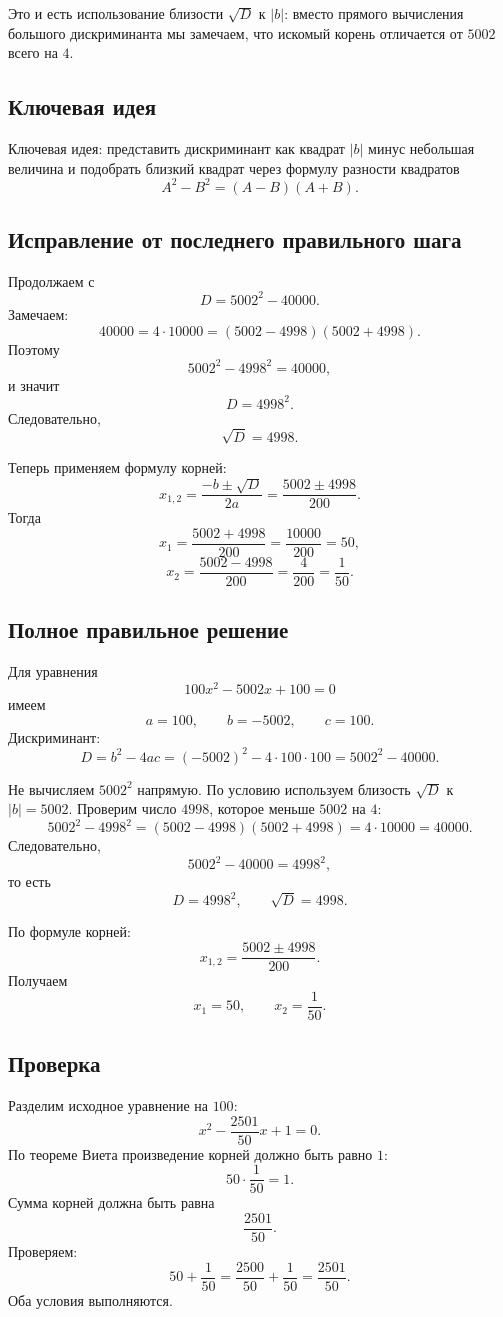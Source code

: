 \documentclass[12pt,a4paper]{article}
\begin{document}
Это и есть использование близости $\sqrt D$ к $|b|$: вместо прямого вычисления большого дискриминанта мы замечаем, что искомый корень отличается от $5002$ всего на $4$.

\subsection*{Ключевая идея}
\textcolor{blue!60!black}{Ключевая идея:} представить дискриминант как квадрат $|b|$ минус небольшая величина и подобрать близкий квадрат через формулу разности квадратов
\[
A^2-B^2=(A-B)(A+B).
\]

\subsection*{Исправление от последнего правильного шага}
Продолжаем с
\[
D=5002^2-40000.
\]
Замечаем:
\[
40000=4\cdot10000
=(5002-4998)(5002+4998).
\]
Поэтому
\[
5002^2-4998^2=40000,
\]
и значит
\[
D=4998^2.
\]
Следовательно,
\[
\sqrt D=4998.
\]

Теперь применяем формулу корней:
\[
x_{1,2}=\frac{-b\pm\sqrt D}{2a}
=\frac{5002\pm4998}{200}.
\]
Тогда
\[
x_1=\frac{5002+4998}{200}
=\frac{10000}{200}=50,
\]
\[
x_2=\frac{5002-4998}{200}
=\frac{4}{200}=\frac1{50}.
\]

\subsection*{Полное правильное решение}
Для уравнения
\[
100x^2-5002x+100=0
\]
имеем
\[
a=100,\qquad b=-5002,\qquad c=100.
\]
Дискриминант:
\[
D=b^2-4ac
=(-5002)^2-4\cdot100\cdot100
=5002^2-40000.
\]

Не вычисляем $5002^2$ напрямую. По условию используем близость $\sqrt D$ к $|b|=5002$. Проверим число $4998$, которое меньше $5002$ на $4$:
\[
5002^2-4998^2
=(5002-4998)(5002+4998)
=4\cdot10000
=40000.
\]
Следовательно,
\[
5002^2-40000=4998^2,
\]
то есть
\[
D=4998^2,
\qquad
\sqrt D=4998.
\]

По формуле корней:
\[
x_{1,2}=\frac{5002\pm4998}{200}.
\]
Получаем
\[
x_1=50,
\qquad
x_2=\frac1{50}.
\]

\subsection*{Проверка}
Разделим исходное уравнение на $100$:
\[
x^2-\frac{2501}{50}x+1=0.
\]
По теореме Виета произведение корней должно быть равно $1$:
\[
50\cdot\frac1{50}=1.
\]
Сумма корней должна быть равна
\[
\frac{2501}{50}.
\]
Проверяем:
\[
50+\frac1{50}
=\frac{2500}{50}+\frac1{50}
=\frac{2501}{50}.
\]
Оба условия выполняются.
\end{document}
